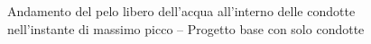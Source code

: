 \begin{figure}[p]
\caption{Andamento del pelo libero dell'acqua all'interno delle condotte nell'instante di massimo picco -- Progetto base con solo condotte}
\label{fig:ProfiliProgettoCondotte}
\end{figure}


